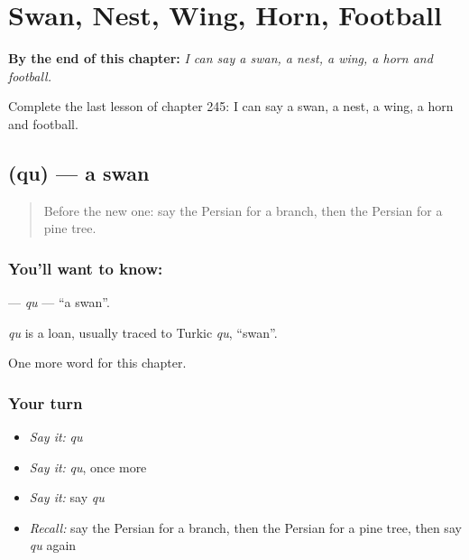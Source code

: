 
\chapter{Swan, Nest, Wing, Horn, Football}
\label{ch:fa-swan-nest-wing-horn-football}

\begin{chapteropening}
\textbf{By the end of this chapter:} \emph{I can say a swan, a nest, a wing, a horn and football.}

Complete the last lesson of chapter 245: I can say a swan, a nest, a wing, a horn and football.
\end{chapteropening}

\section[\texorpdfstring{\fa{قو} (qu)}{قو (qu)}]{ (qu) — a swan}

\label{lesson:FA-C245-qu}



\begin{quote}
Before the new one: say the Persian for a branch, then the Persian for a pine tree.
\end{quote}

\subsection*{You'll want to know: }
\textbf{} — \emph{qu} — \textquotedblleft{}a swan\textquotedblright{}.

\begin{cousinweb}
\emph{qu} is a loan, usually traced to Turkic \emph{qu}, \textquotedblleft{}swan\textquotedblright{}.
\end{cousinweb}

\begin{grammarlens}[title={What you've built}]
One more word for this chapter.
\end{grammarlens}

\subsection*{Your turn}
\begin{itemize}
\raggedright
  \item \emph{Say it:} \emph{qu}
  \item \emph{Say it:} \emph{qu}, once more
  \item \emph{Say it:} say \emph{qu}
  \item \emph{Recall:} say the Persian for a branch, then the Persian for a pine tree, then say \emph{qu} again
\end{itemize}

